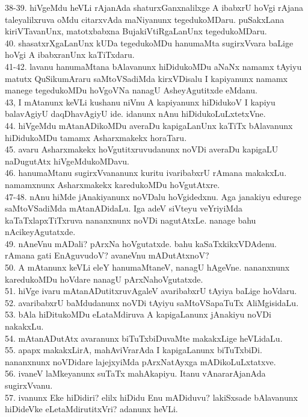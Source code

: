 \documentclass{article}
\begin{document}
38-39. hiVgeMdu heVLi rAjanAda shaturxGanxnalilxge A ibabxrU hoVgi rAjana taleyalilxruva oMdu citarxvAda maNiyanunx tegedukoMDaru. puSakxLana kiriVTavanUnx, matotxbabxna BujakiVtiRgaLanUnx tegedukoMDaru.\\
40. shasatxrXgaLanUnx kUDa tegedukoMDu hanumaMta sugirxVvara baLige hoVgi A ibabxranUnx kaTiTxdaru.\\
41-42. lavanu hanumaMtana bAlavanunx hiDidukoMDu aNaNx namamx tAyiyu matutx QuSikumAraru saMtoVSadiMda kirxVDisalu I kapiyanunx namamx manege tegedukoMDu hoVgoVNa nanagU AsheyAgutitxde eMdanu.\\
43, I mAtanunx keVLi kushanu niVnu A kapiyanunx hiDidukoV I kapiyu balavAgiyU daqDhavAgiyU ide. idanunx nAnu hiDidukoLuLxtetxVne.\\
44. hiVgeMdu mAtanADikoMDu averaDu kapigaLanUnx kaTiTx bAlavanunx hiDidukoMDu tamamx Asharxmakekx horaTaru.\\
45. avaru Asharxmakekx hoVgutitxruvudanunx noVDi averaDu kapigaLU naDugutAtx hiVgeMdukoMDavu.\\
46. hanumaMtanu sugirxVvananunx kuritu ivaribabxrU rAmana makakxLu. namamxnunx Asharxmakekx karedukoMDu hoVgutAtxre.\\
47-48. nAnu hiMde jAnakiyanunx noVDalu hoVgidedxnu. Aga janakiyu edurege saMtoVSadiMda mAtanADidaLu. Iga adeV siVteyu veYriyiMda kaTaTxlapxTiTxruva nananxnunx noVDi nagutAtxLe. nanage bahu nAcikeyAgutatxde.\\
49. nAneVnu mADali? pArxNa hoVgutatxde. bahu kaSaTxkikxVDAdenu. rAmana gati EnAguvudoV? avaneVnu mADutAtxnoV?\\
50. A mAtanunx keVLi eleY hanumaMtaneV, nanagU hAgeVne. nananxnunx karedukoMDu hoVdare nanagU pArxNahoVgutatxde.\\
51. hiVge ivaru mAtanADutitxruvAgaleV avaribabxrU tAyiya baLige hoVdaru.\\
52. avaribabxrU baMdudanunx noVDi tAyiyu saMtoVSapaTuTx AliMgisidaLu.\\
53. bAla hiDitukoMDu eLataMdiruva A kapigaLanunx jAnakiyu noVDi nakakxLu.\\
54. mAtanADutAtx avaranunx biTuTxbiDuvaMte makakxLige heVLidaLu.\\
55. apapx makakxLirA, mahAviVrarAda I kapigaLanunx biTuTxbiDi. nananxnunx noVDidare lajejxyiMda pArxNatAyxga mADikoLuLxtatxve.\\
56. ivaneV laMkeyanunx suTaTx mahAkapiyu. Itanu vAnararAjanAda sugirxVvanu.\\
57. ivanunx Eke hiDidiri? elilx hiDidu Enu mADiduvu? lakiSxsade bAlavanunx hiDideVke eLetaMdirutitxVri? adanunx heVLi.\\
\end{document}
